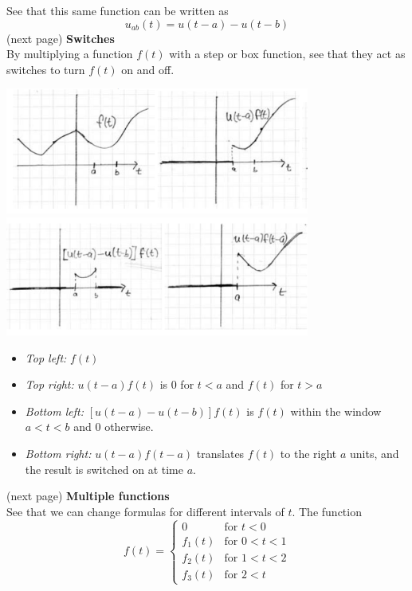 \documentclass{report}
\begin{document}
See that this same function can be written as
\begin{equation*}
u_{ab}(t)=u(t-a)-u(t-b)
\end{equation*}
(next page)\newpage
\noindent\textbf{Switches}\\
By multiplying a function $f(t)$ with a step or box function, see that they act as switches to turn
$f(t)$ on and off.
\begin{center}
\includegraphics[width=10cm]{43}\\
\includegraphics[width=10cm]{44}
\end{center}
\begin{itemize}
\item\textit{Top left:} $f(t)$
\item\textit{Top right:} $u(t-a)f(t)$ is 0 for $t<a$ and $f(t)$ for $t>a$
\item\textit{Bottom left:} $[u(t-a)-u(t-b)]f(t)$ is $f(t)$ within the window $a<t<b$ and 0 otherwise.
\item\textit{Bottom right:} $u(t-a)f(t-a)$ translates $f(t)$ to the right $a$ units, 
and the result is switched on at time $a$.
\end{itemize}
(next page)\newpage
\noindent\textbf{Multiple functions}\\
See that we can change formulas for different intervals of $t$. The function
\begin{equation*}
f(t)=\begin{cases}
0&\text{for }t<0\\
f_1(t)&\text{for }0<t<1\\
f_2(t)&\text{for }1<t<2\\
f_3(t)&\text{for }2<t
\end{cases}
\end{equation*}
\end{document}
